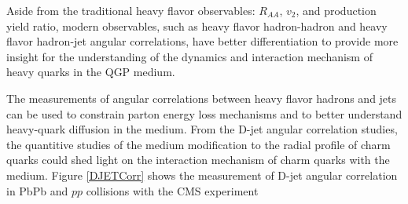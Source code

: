 Aside from the traditional heavy flavor observables: $R_{AA}$, $v_{2}$, and production yield ratio, modern observables, such as heavy flavor hadron-hadron and heavy flavor hadron-jet angular correlations, have better differentiation to provide more insight for the understanding of the dynamics and interaction mechanism of heavy quarks in the QGP medium. 

The measurements of angular correlations between heavy flavor hadrons and jets can be used to constrain parton energy loss mechanisms and to better understand heavy-quark diffusion in the medium. From the D-jet angular correlation studies, the quantitive studies of the medium modification to the radial profile of charm quarks could shed light on the interaction mechanism of charm quarks with the medium. Figure \ref{DJETCorr} shows the measurement of D-jet angular correlation in PbPb and $pp$ collisions with the CMS experiment \cite{CMSDJet}

